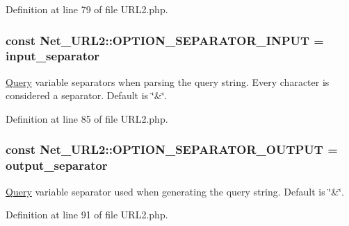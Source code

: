 Definition at line 79 of file U\+R\+L2.\+php.

\hypertarget{classNet__URL2_af5b6f766fae9600b3938e33c32893bce}{}
\subsubsection[{O\+P\+T\+I\+O\+N\+\_\+\+S\+E\+P\+A\+R\+A\+T\+O\+R\+\_\+\+I\+N\+P\+U\+T}]{\setlength{\rightskip}{0pt plus 5cm}const Net\+\_\+\+U\+R\+L2\+::\+O\+P\+T\+I\+O\+N\+\_\+\+S\+E\+P\+A\+R\+A\+T\+O\+R\+\_\+\+I\+N\+P\+U\+T = \textquotesingle{}input\+\_\+separator\textquotesingle{}}\label{classNet__URL2_af5b6f766fae9600b3938e33c32893bce}
\hyperlink{classQuery}{Query} variable separators when parsing the query string. Every character is considered a separator. Default is \char`\"{}\&\char`\"{}. 

Definition at line 85 of file U\+R\+L2.\+php.

\hypertarget{classNet__URL2_a84719f522747f51638a9c8474d4abc39}{}
\subsubsection[{O\+P\+T\+I\+O\+N\+\_\+\+S\+E\+P\+A\+R\+A\+T\+O\+R\+\_\+\+O\+U\+T\+P\+U\+T}]{\setlength{\rightskip}{0pt plus 5cm}const Net\+\_\+\+U\+R\+L2\+::\+O\+P\+T\+I\+O\+N\+\_\+\+S\+E\+P\+A\+R\+A\+T\+O\+R\+\_\+\+O\+U\+T\+P\+U\+T = \textquotesingle{}output\+\_\+separator\textquotesingle{}}\label{classNet__URL2_a84719f522747f51638a9c8474d4abc39}
\hyperlink{classQuery}{Query} variable separator used when generating the query string. Default is \char`\"{}\&\char`\"{}. 

Definition at line 91 of file U\+R\+L2.\+php.

\hypertarget{classNet__URL2_a766955033bdccec7175d0694df62a1a9}{}
